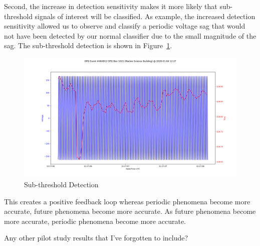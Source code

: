 Second, the increase in detection sensitivity makes it more likely that sub-threshold signals of interest will be classified. As example, the increased detection sensitivity allowed us to observe and classify a periodic voltage sag that would not have been detected by our normal classifier due to the small magnitude of the sag. The sub-threshold detection is shown in Figure~\ref{fig:sub-threshold-detection}.

\begin{figure}[H]
    \centering
    \includegraphics[width=0.85\linewidth]{images/pilot/subthreshold-signal.png}
    \caption{Sub-threshold Detection}
    \label{fig:sub-threshold-detection}
\end{figure}

This creates a positive feedback loop whereas periodic phenomena become more accurate, future phenomena become more accurate. As future phenomena become more accurate, periodic phenomena become more accurate.

\begin{tcolorbox}[title=ANTHONY AND SERGE]
Any other pilot study results that I've forgotten to include?
\end{tcolorbox}





